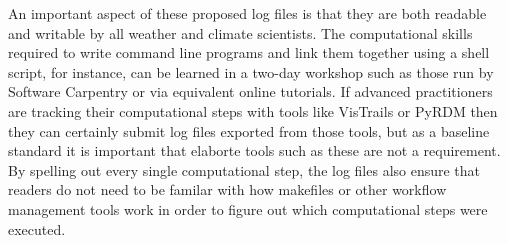 An important aspect of these proposed log files is that they are both readable and writable by all weather and climate scientists. The computational skills required to write command line programs and link them together using a shell script, for instance, can be learned in a two-day workshop such as those run by Software Carpentry \citep{Wilson2014} or via equivalent online tutorials. If advanced practitioners are tracking their computational steps with tools like VisTrails or PyRDM then they can certainly submit log files exported from those tools, but as a baseline standard it is important that elaborte tools such as these are not a requirement. By spelling out every single computational step, the log files also ensure that readers do not need to be familar with how makefiles or other workflow management tools work in order to figure out which computational steps were executed.  

